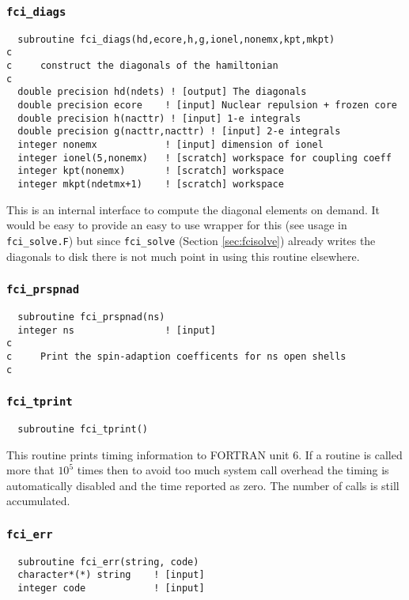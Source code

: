 \subsubsection{{\tt fci\_diags}}
\begin{verbatim}
  subroutine fci_diags(hd,ecore,h,g,ionel,nonemx,kpt,mkpt)
c     
c     construct the diagonals of the hamiltonian 
c     
  double precision hd(ndets) ! [output] The diagonals
  double precision ecore    ! [input] Nuclear repulsion + frozen core
  double precision h(nacttr) ! [input] 1-e integrals
  double precision g(nacttr,nacttr) ! [input] 2-e integrals
  integer nonemx            ! [input] dimension of ionel
  integer ionel(5,nonemx)   ! [scratch] workspace for coupling coeff
  integer kpt(nonemx)       ! [scratch] workspace
  integer mkpt(ndetmx+1)    ! [scratch] workspace
\end{verbatim}
This is an internal interface to compute the diagonal elements on
demand.  It would be easy to provide an easy to use wrapper for this
(see usage in \verb+fci_solve.F+) but since \verb+fci_solve+ (Section
\ref{sec:fcisolve}) already writes the diagonals to disk there is
not much point in using this routine elsewhere.

\subsubsection{{\tt fci\_prspnad}}
\begin{verbatim}
  subroutine fci_prspnad(ns)
  integer ns                ! [input]
c
c     Print the spin-adaption coefficents for ns open shells
c
\end{verbatim}

\subsubsection{{\tt fci\_tprint}}

\begin{verbatim}
  subroutine fci_tprint()
\end{verbatim}

This routine prints timing information to FORTRAN unit 6.  If a
routine is called more that $10^5$ times then to avoid too much system
call overhead the timing is automatically disabled and the time
reported as zero.  The number of calls is still accumulated.

\subsubsection{{\tt fci\_err}}
\begin{verbatim}
  subroutine fci_err(string, code)
  character*(*) string    ! [input]
  integer code            ! [input]
\end{verbatim}

